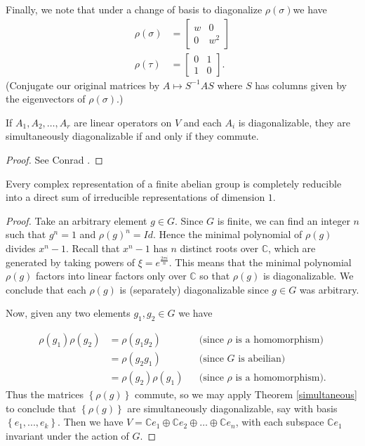 \begin{example}
Finally, we note that under a change of basis to diagonalize $\rho(\sigma)$we have
\begin{align*}
\rho(\sigma) &= \begin{bmatrix}w & 0 \\ 0 &w^{2}  \end{bmatrix} \\
\rho(\tau) &= \begin{bmatrix} 0 & 1 \\ 1 & 0 \end{bmatrix}.
\end{align*} 
(Conjugate our original matrices by $A \mapsto S^{-1}AS$ where $S$ has columns given by the eigenvectors of $\rho(\sigma)$.)
\end{example}

\begin{thm}\label{simultaneous} If $A_1, A_2, \ldots, A_r$ are linear operators on $V$ and each $A_i$ is diagonalizable, they are simultaneously diagonalizable if and only if they commute.
\end{thm}
\begin{proof}
 See Conrad \cite[Theorem 5.1] {ConradMinPoly}.
\end{proof}

\begin{thm} Every complex representation of a finite abelian group is completely reducible into a direct sum of irreducible representations of dimension $1$.  
\end {thm}
\begin{proof}
Take an arbitrary element $g \in G$.  Since $G$ is finite, we can find an integer $n$ such that $g^n = 1$ and $\rho(g)^n = Id$.    Hence the minimal polynomial of $\rho(g)$ divides  $x^n -1$.  Recall that $x^n-1$ has $n$ distinct roots over $\mathbb{C}$, which are generated by taking powers of $\xi = e^{\frac{2 \pi i}{n}}$.  This means that the minimal polynomial $\rho(g)$ factors into linear factors only over $\mathbb{C}$ so that $\rho(g)$ is diagonalizable.  We conclude that each $\rho(g)$ is (separately) diagonalizable since $g \in G$ was arbitrary.

Now, given any two elements $g_1, g_2 \in G$ we have 

\begin{align*}
\rho(g_1) \rho(g_2)&= \rho(g_1 g_2)&& \text{(since $\rho$ is a homomorphism)} \\
		&=  \rho(g_2 g_1) && \text{(since $G$ is abeilian)} \\
		&= \rho(g_2) \rho(g_1) && \text{(since $\rho$ is a homomorphism)}.
\end{align*}
Thus the matrices $\left\{ \rho(g)\right\}$ commute, so we may apply Theorem \ref{simultaneous} to conclude that $\left\{ \rho(g)\right\}$ are simultaneously diagonalizable, say with basis $\left\{ e_1, ..., e_k \right\}$.  Then we have $V= \mathbb{C}e_1 \oplus \mathbb{C} e_2 \oplus \ldots \oplus \mathbb{C} e_n$, with each subspace $ \mathbb{C}e_1$ invariant under the action of $G$.
\end{proof}

